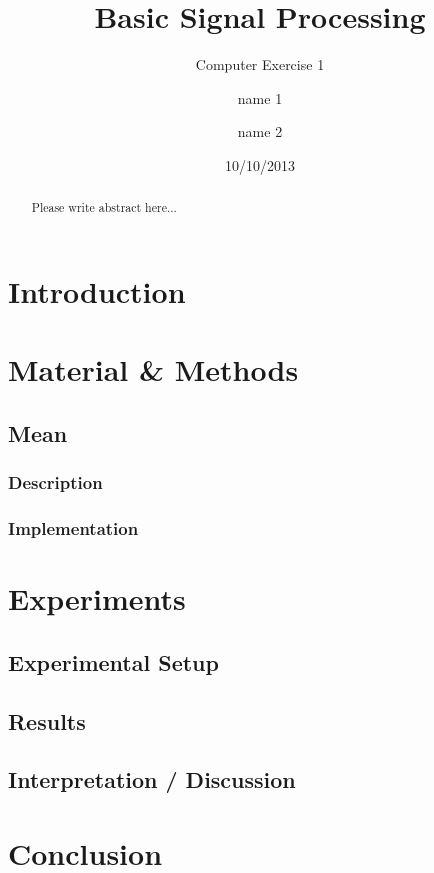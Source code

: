 \documentclass[a4paper,10pt]{article}
\title{Basic Signal Processing}
\subtitle{Computer Exercise 1}
\author{name 1  \and name 2}
\date{10/10/2013}
\begin{document}
\maketitle

\begin{abstract}
Please write abstract here...	
\end{abstract}

\section{Introduction}

\section{Material \& Methods}
\subsection{Mean}
\subsubsection{Description}
\subsubsection{Implementation}

\section{Experiments}
\subsection{Experimental Setup}
\subsection{Results}
\subsection{Interpretation / Discussion}

\section{Conclusion}


 
\end{document}
